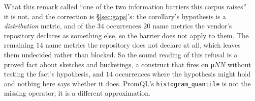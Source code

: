What this remark called ``one of the two information barriers this corpus raises'' it is
not, and the correction is \S\ref{sec:gaps}'s: the corollary's hypothesis is a
\emph{distribution} metric, and of the $34$ occurrences $20$ name metrics the vendor's
repository declares as something else, so the barrier does not apply to them. The
remaining $14$ name metrics the repository does not declare at all, which leaves them
undecided rather than blocked. So the sound reading of this refusal is a proved fact
about sketches and bucketings, a construct that fires on \texttt{p}$NN$ without testing
the fact's hypothesis, and $14$ occurrences where the hypothesis might hold and nothing
here says whether it does. PromQL's \texttt{histogram\_quantile} is not
the missing operator; it is a different approximation.

